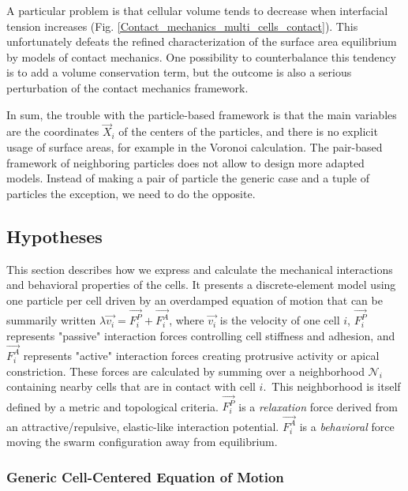 A particular problem is that cellular volume tends to decrease when interfacial tension increases (Fig. \ref{Contact_mechanics_multi_cells_contact}). This unfortunately defeats the refined characterization of the surface area equilibrium by models of contact mechanics. One possibility to counterbalance this tendency is to add a volume conservation term, but the outcome is also a serious perturbation of the contact mechanics framework.

In sum, the trouble with the particle-based framework is that the main variables are the coordinates $\vec{X}_i$ of the centers of the particles, and there is no explicit usage of surface areas, for example in the Voronoi calculation. The pair-based framework of neighboring particles does not allow to design more adapted models. Instead of making a pair of particle the generic case and a tuple of particles the exception, we need to do the opposite.


\subsection{Hypotheses}


  This section describes how we express and calculate the mechanical interactions and behavioral properties of the cells. It presents a discrete-element model using one particle per cell driven by an overdamped equation of motion that can be summarily written $\lambda \vec{v_i} = \vec{F_i^P}+\vec{F_i^A}$, where $\vec{v_i}$ is the velocity of one cell $i$, $\vec{F_i^P}$ represents "passive" interaction forces controlling cell stiffness and adhesion, and $\vec{F_i^A}$ represents "active" interaction forces creating protrusive activity or apical constriction. These forces are calculated by summing over a neighborhood $\mathcal{N}_i$ containing nearby cells that are in contact with cell $i$. This neighborhood is itself defined by a metric and topological criteria. $\vec{F_i^P}$ is a \textit{relaxation} force derived from an attractive/repulsive, elastic-like interaction potential. $\vec{F_i^A}$ is a \textit{behavioral} force moving the swarm configuration away from equilibrium. 


\subsubsection{Generic Cell-Centered Equation of Motion}


